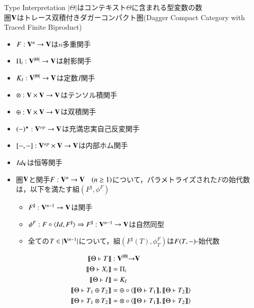 \documentclass[8pt]{jsarticle}
\newcommand{\semantics}[1]{{\llbracket #1 \rrbracket}}
\begin{document}
\begin{itembox}[c]{Type Interpretation}
$|\Theta|$はコンテキスト$\Theta$に含まれる型変数の数 \\
圏$\bf{V}$はトレース双積付きダガーコンパクト圏(Dagger Compact Category with Traced Finite Biproduct)
\begin{itemize}
  \item $F: {\bf V}^n \rightarrow {\bf V}$は$n$多重関手
  \item $\Pi_i:{\bf V}^{|\Theta|} \rightarrow {\bf V}$は射影関手
  \item $K_I:{\bf V}^{|\Theta|} \rightarrow {\bf V}$は定数$I$関手
  \item $\otimes:{\bf V} \times {\bf V} \rightarrow {\bf V}$はテンソル積関手
  \item $\oplus:{\bf V} \times {\bf V} \rightarrow {\bf V}$は双積関手
  \item $(-)^\star:{\bf V}^{op} \rightarrow {\bf V}$は充満忠実自己反変関手
  \item $[-,-]:{\bf V}^{op} \times {\bf V} \rightarrow {\bf V}$は内部ホム関手
  \item $Id_{\bf V}$は恒等関手
  \item 圏$\bf{V}$と関手$F:{\bf V}^n \rightarrow {\bf V}\quad(n \ge 1)$について，パラメトライズされた$F$の始代数は，以下を満たす組$(F^\sharp, \phi^F)$
    \begin{itemize}
      \item $F^\sharp:{\bf V}^{n-1} \rightarrow {\bf V}$は関手
      \item $\phi^F:F\circ\langle{Id,F^\sharp}\rangle \Rightarrow F^\sharp:{\bf V}^{n-1} \rightarrow {\bf V}$は自然同型
      \item 全ての$T\in|{\bf V}^{n-1}|$について，組$(F^\sharp(T),\phi^F_T)$は$F(T,-)\mathchar`-$始代数
    \end{itemize}
\end{itemize}
  \begin{align*}
    \semantics{\Theta \vdash T}                  &: {\bf V}^{|\Theta|} {\bf\rightarrow} {\bf V} \\
    \semantics{\Theta \vdash X_i}                &= \Pi_i \\
    \semantics{\Theta \vdash I}                  &= K_I \\
    \semantics{\Theta \vdash T_1\oplus{}T_2}     &= \oplus\circ\langle\semantics{\Theta \vdash T_1},\semantics{\Theta \vdash T_2}\rangle \\
    \semantics{\Theta \vdash T_1\otimes{}T_2}    &= \otimes\circ\langle\semantics{\Theta \vdash T_1},\semantics{\Theta \vdash T_2}\rangle \\

\end{align*}
\end{itembox}
\end{document}
